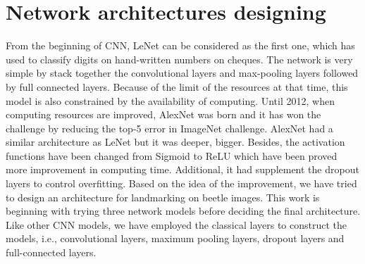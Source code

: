 \documentclass[review]{elsarticle}
\begin{document}
\section{Network architectures designing}
\label{Sneuralnetwork}
From the beginning of CNN, LeNet \cite{lecun1998gradient} can be considered as the first one, which has used to classify digits on hand-written numbers on cheques. The network is very simple by stack together the convolutional layers and max-pooling layers followed by full connected layers. Because of the limit of the resources at that time, this model is also constrained by the availability of computing. Until 2012, when computing resources are improved, AlexNet \cite{krizhevsky2012imagenet} was born and it has won the challenge by reducing the top-5 error in ImageNet challenge. AlexNet had a similar architecture as LeNet but it was deeper, bigger. Besides, the activation functions have been changed from Sigmoid \cite{han1995influence} to ReLU \cite{nair2010rectified} which have been proved more improvement in computing time. Additional, it had supplement the dropout layers to control overfitting. Based on the idea of the improvement, we have tried to design an architecture for landmarking on beetle images. This work is beginning with trying three network models before deciding the final architecture. Like other CNN models, we have employed the classical layers to construct the models, i.e., convolutional layers, maximum pooling layers, dropout layers and full-connected layers.
\end{document}
